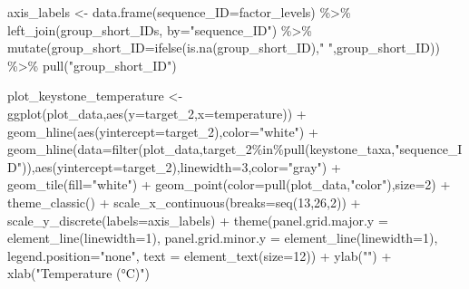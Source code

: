 \documentclass[
  letterpaper,
  DIV=11,
  numbers=noendperiod]{scrreprt}
\newenvironment{Shaded}{\begin{snugshade}}{\end{snugshade}}
\newcommand{\AttributeTok}[1]{\textcolor[rgb]{0.40,0.45,0.13}{#1}}
\newcommand{\DecValTok}[1]{\textcolor[rgb]{0.68,0.00,0.00}{#1}}
\newcommand{\FunctionTok}[1]{\textcolor[rgb]{0.28,0.35,0.67}{#1}}
\newcommand{\NormalTok}[1]{\textcolor[rgb]{0.00,0.23,0.31}{#1}}
\newcommand{\OtherTok}[1]{\textcolor[rgb]{0.00,0.23,0.31}{#1}}
\newcommand{\SpecialCharTok}[1]{\textcolor[rgb]{0.37,0.37,0.37}{#1}}
\newcommand{\StringTok}[1]{\textcolor[rgb]{0.13,0.47,0.30}{#1}}
\begin{document}
\begin{Shaded}
\begin{Highlighting}[]
\NormalTok{axis\_labels }\OtherTok{\textless{}{-}} \FunctionTok{data.frame}\NormalTok{(}\AttributeTok{sequence\_ID=}\NormalTok{factor\_levels) }\SpecialCharTok{\%\textgreater{}\%}
  \FunctionTok{left\_join}\NormalTok{(group\_short\_IDs, }\AttributeTok{by=}\StringTok{"sequence\_ID"}\NormalTok{) }\SpecialCharTok{\%\textgreater{}\%}
  \FunctionTok{mutate}\NormalTok{(}\AttributeTok{group\_short\_ID=}\FunctionTok{ifelse}\NormalTok{(}\FunctionTok{is.na}\NormalTok{(group\_short\_ID),}\StringTok{" "}\NormalTok{,group\_short\_ID)) }\SpecialCharTok{\%\textgreater{}\%}
  \FunctionTok{pull}\NormalTok{(}\StringTok{"group\_short\_ID"}\NormalTok{)}

\NormalTok{plot\_keystone\_temperature }\OtherTok{\textless{}{-}} \FunctionTok{ggplot}\NormalTok{(plot\_data,}\FunctionTok{aes}\NormalTok{(}\AttributeTok{y=}\NormalTok{target\_2,}\AttributeTok{x=}\NormalTok{temperature)) }\SpecialCharTok{+}
  \FunctionTok{geom\_hline}\NormalTok{(}\FunctionTok{aes}\NormalTok{(}\AttributeTok{yintercept=}\NormalTok{target\_2),}\AttributeTok{color=}\StringTok{"white"}\NormalTok{) }\SpecialCharTok{+}
  \FunctionTok{geom\_hline}\NormalTok{(}\AttributeTok{data=}\FunctionTok{filter}\NormalTok{(plot\_data,target\_2}\SpecialCharTok{\%in\%}\FunctionTok{pull}\NormalTok{(keystone\_taxa,}\StringTok{"sequence\_ID"}\NormalTok{)),}\FunctionTok{aes}\NormalTok{(}\AttributeTok{yintercept=}\NormalTok{target\_2),}\AttributeTok{linewidth=}\DecValTok{3}\NormalTok{,}\AttributeTok{color=}\StringTok{"gray"}\NormalTok{) }\SpecialCharTok{+}
  \FunctionTok{geom\_tile}\NormalTok{(}\AttributeTok{fill=}\StringTok{"white"}\NormalTok{) }\SpecialCharTok{+}
  \FunctionTok{geom\_point}\NormalTok{(}\AttributeTok{color=}\FunctionTok{pull}\NormalTok{(plot\_data,}\StringTok{"color"}\NormalTok{),}\AttributeTok{size=}\DecValTok{2}\NormalTok{) }\SpecialCharTok{+}
  \FunctionTok{theme\_classic}\NormalTok{() }\SpecialCharTok{+}
  \FunctionTok{scale\_x\_continuous}\NormalTok{(}\AttributeTok{breaks=}\FunctionTok{seq}\NormalTok{(}\DecValTok{13}\NormalTok{,}\DecValTok{26}\NormalTok{,}\DecValTok{2}\NormalTok{)) }\SpecialCharTok{+}
  \FunctionTok{scale\_y\_discrete}\NormalTok{(}\AttributeTok{labels=}\NormalTok{axis\_labels) }\SpecialCharTok{+}
  \FunctionTok{theme}\NormalTok{(}\AttributeTok{panel.grid.major.y =} \FunctionTok{element\_line}\NormalTok{(}\AttributeTok{linewidth=}\DecValTok{1}\NormalTok{),}
        \AttributeTok{panel.grid.minor.y =} \FunctionTok{element\_line}\NormalTok{(}\AttributeTok{linewidth=}\DecValTok{1}\NormalTok{),}
        \AttributeTok{legend.position=}\StringTok{"none"}\NormalTok{,}
        \AttributeTok{text =} \FunctionTok{element\_text}\NormalTok{(}\AttributeTok{size=}\DecValTok{12}\NormalTok{)) }\SpecialCharTok{+}
  \FunctionTok{ylab}\NormalTok{(}\StringTok{""}\NormalTok{) }\SpecialCharTok{+} \FunctionTok{xlab}\NormalTok{(}\StringTok{"Temperature (°C)"}\NormalTok{)}


\end{Highlighting}
\end{Shaded}
\end{document}
